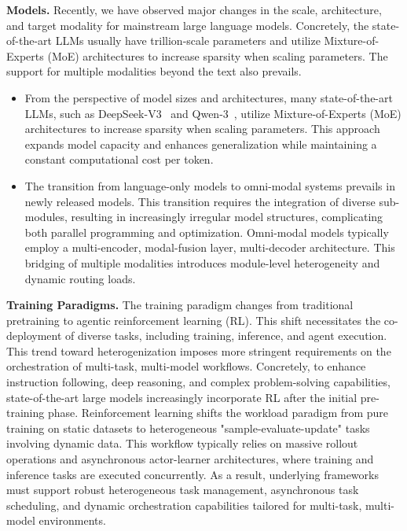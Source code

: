 \documentclass[11pt]{article}
\begin{document}
\noindent \textbf{Models.} Recently, we have observed major changes in the scale, architecture, and target modality for mainstream large language models. Concretely, the state-of-the-art LLMs usually have trillion-scale parameters and utilize Mixture-of-Experts (MoE) architectures to increase sparsity when scaling parameters. The support for multiple modalities beyond the text also prevails.

\begin{itemize}
    \item From the perspective of model sizes and architectures, many state-of-the-art LLMs, such as DeepSeek-V3~\cite{liu2024deepseek} and Qwen-3~\cite{yang2025qwen3}, utilize Mixture-of-Experts (MoE) architectures to increase sparsity when scaling parameters. This approach expands model capacity and enhances generalization while maintaining a constant computational cost per token. 
    \item The transition from language-only models to omni-modal systems prevails in newly released models. This transition requires the integration of diverse sub-modules, resulting in increasingly irregular model structures, complicating both parallel programming and optimization. Omni-modal models typically employ a multi-encoder, modal-fusion layer, multi-decoder architecture. This bridging of multiple modalities introduces module-level heterogeneity and dynamic routing loads.
\end{itemize}

\noindent \textbf{Training Paradigms.} The training paradigm changes from traditional pretraining to agentic reinforcement learning (RL). This shift necessitates the co-deployment of diverse tasks, including training, inference, and agent execution. This trend toward heterogenization imposes more stringent requirements on the orchestration of multi-task, multi-model workflows. Concretely, to enhance instruction following, deep reasoning, and complex problem-solving capabilities, state-of-the-art large models increasingly incorporate RL after the initial pre-training phase. Reinforcement learning shifts the workload paradigm from pure training on static datasets to heterogeneous "sample-evaluate-update" tasks involving dynamic data. This workflow typically relies on massive rollout operations and asynchronous actor-learner architectures, where training and inference tasks are executed concurrently. As a result, underlying frameworks must support robust heterogeneous task management, asynchronous task scheduling, and dynamic orchestration capabilities tailored for multi-task, multi-model environments.
\end{document}
